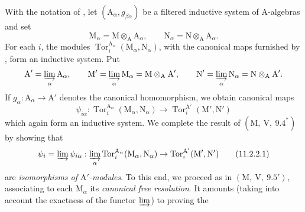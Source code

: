 \begin{env}[11.2.2]
\label{IV.11.2.2}
With the notation of , let
$(\mathrm{A}_\alpha,g_{\beta\alpha})$ be a filtered inductive system of
$\mathrm{A}$-algebras and set
\[
  \mathrm{M}_\alpha=\mathrm{M}\otimes_\mathrm{A}\mathrm{A}_\alpha,
  \qquad
  \mathrm{N}_\alpha=\mathrm{N}\otimes_\mathrm{A}\mathrm{A}_\alpha.
\]
For each $i$, the modules
$\operatorname{Tor}_i^{\mathrm{A}_\alpha}
(\mathrm{M}_\alpha,\mathrm{N}_\alpha)$, with the canonical maps furnished
by , form an inductive system. Put
\[
  \mathrm{A}'=\varinjlim_\alpha\mathrm{A}_\alpha,\qquad
  \mathrm{M}'=\varinjlim_\alpha\mathrm{M}_\alpha
    =\mathrm{M}\otimes_\mathrm{A}\mathrm{A}',\qquad
  \mathrm{N}'=\varinjlim_\alpha\mathrm{N}_\alpha
    =\mathrm{N}\otimes_\mathrm{A}\mathrm{A}'.
\]
If $g_\alpha:\mathrm{A}_\alpha\to\mathrm{A}'$ denotes the canonical
homomorphism, we obtain canonical maps
\[
  \psi_{i\alpha}:
  \operatorname{Tor}_i^{\mathrm{A}_\alpha}
    (\mathrm{M}_\alpha,\mathrm{N}_\alpha)
  \longrightarrow
  \operatorname{Tor}_i^{\mathrm{A}'}(\mathrm{M}',\mathrm{N}')
\]
which again form an inductive system. We complete the result of
$(\mathrm{M},~\mathrm{V},~9.4^*)$ by showing that
\begin{equation}
  \psi_i=\varinjlim\psi_{i\alpha}:\varinjlim_\alpha\operatorname{Tor}_i^{\mathrm{A}_\alpha}(\mathrm{M}_\alpha,\mathrm{N}_\alpha)\to\operatorname{Tor}_i^{\mathrm{A}'}(\mathrm{M}',\mathrm{N}')
  \label{IV.11.2.2.1}
\tag{11.2.2.1}
\end{equation}
are \emph{isomorphisms of $\mathrm{A}'$-modules}. To this end, we proceed as in $(\mathrm{M},~\mathrm{V},~9.5')$, associating to each $\mathrm{M}_\alpha$ its \emph{canonical free resolution}. It amounts (taking into account the exactness of the functor $\varinjlim$) to proving the
\end{env}


